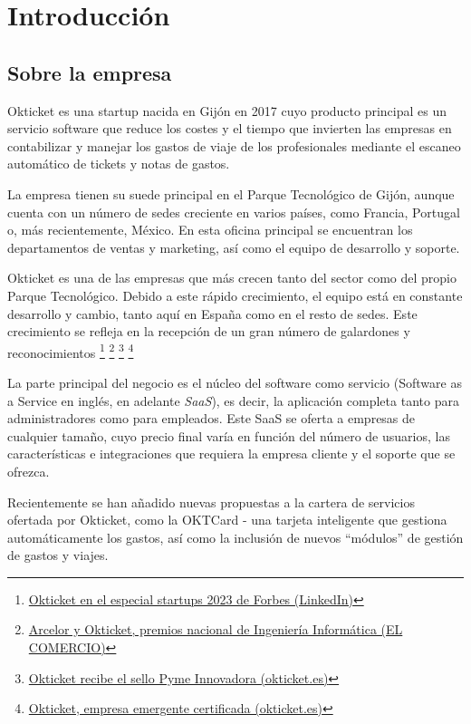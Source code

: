 \chapter{Introducción}
\section{Sobre la empresa}
Okticket es una startup nacida en Gijón en 2017 cuyo producto principal es un servicio software
que reduce los costes y el tiempo que invierten las empresas en contabilizar y manejar los gastos
de viaje de los profesionales mediante el escaneo automático de tickets y notas de gastos.

La empresa tienen su suede principal  en el Parque Tecnológico de Gijón, aunque cuenta con un número
de sedes creciente en varios países, como Francia, Portugal o, más recientemente, México. En esta
oficina principal se encuentran los departamentos de ventas y marketing, así como el equipo de
desarrollo y soporte.

Okticket es una de las empresas que más crecen tanto del sector como del propio Parque
Tecnológico. Debido a este rápido crecimiento, el equipo está en constante desarrollo y
cambio, tanto aquí en España como en el resto de sedes. Este crecimiento se refleja
en la recepción de un gran número de galardones y reconocimientos
\footnote{\href{https://www.linkedin.com/posts/okticket_okticket-en-el-especial-startups-de-forbes-activity-7140622980618903552-UGWK}{Okticket en el especial startups 2023 de Forbes (LinkedIn)}}
\footnote{\href{https://www.elcomercio.es/economia/arcelor-okticket-premios-20230222002438-ntvo.html}{Arcelor y Okticket, premios nacional de Ingeniería Informática (EL COMERCIO)}}
\footnote{\href{https://www.okticket.es/blog/empresa-pyme-innovadora}{Okticket recibe el sello Pyme Innovadora (okticket.es)}}
\footnote{\href{https://www.okticket.es/blog/okticket-empresa-emergente-certificada}{Okticket, empresa emergente certificada (okticket.es)}}

La parte principal del negocio es el núcleo del software como servicio (Software as a
Service en inglés, en adelante \textit{SaaS}), es decir, la aplicación completa tanto
para administradores como para empleados. Este SaaS se oferta a empresas de cualquier
tamaño, cuyo precio final varía en función del número de usuarios, las características
e integraciones que requiera la empresa cliente y el soporte que se ofrezca.

Recientemente se han añadido nuevas propuestas a la cartera de servicios ofertada por
Okticket, como la OKTCard {-} una tarjeta inteligente que gestiona automáticamente los gastos,
así como la inclusión de nuevos ``módulos'' de gestión de gastos y viajes.

